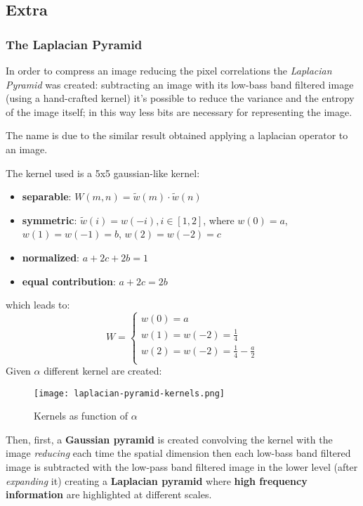\subsection{Extra}


\subsubsection{The Laplacian Pyramid \cite{laplacianpyramid}}
In order to compress an image reducing the pixel correlations the \textit{Laplacian Pyramid} was created: subtracting an image with its low-bass band filtered image (using a hand-crafted kernel) it's possible to reduce the variance and the entropy of the image itself; in this way less bits are necessary for representing the image.

The name is due to the similar result obtained applying a laplacian operator to an image.

The kernel used is a 5x5 gaussian-like kernel:
\begin{itemize}
    \item \textbf{separable}: $W(m,n) = \tilde{w}(m) \cdot \tilde{w}(n) $
    \item \textbf{symmetric}: $\tilde{w}(i)=w(-i), i \in [1,2]$, where $w(0)=a$, $w(1)=w(-1)=b$, $w(2)=w(-2)=c$
    \item \textbf{normalized}: $a+2c+2b=1$
    \item \textbf{equal contribution}: $a+2c=2b$
\end{itemize}
which leads to:
$$
W = \begin{cases}
    w(0)=a \\
    w(1)=w(-2)=\frac{1}{4} \\
    w(2)=w(-2)=\frac{1}{4} - \frac{a}{2} \\
\end{cases}
$$
Given $\alpha$ different kernel are created:
\begin{figure}[H]
    \centering
    \texttt{[image: laplacian-pyramid-kernels.png]}
    \caption{Kernels as function of $\alpha$}
\end{figure}

Then, first, a \textbf{Gaussian pyramid} is created convolving the kernel with the image \textit{reducing} each time the spatial dimension then each low-bass band filtered image is subtracted with the low-pass band filtered image in the lower level (after \textit{expanding} it) creating a \textbf{Laplacian pyramid} where \textbf{high frequency information} are highlighted at different scales.


